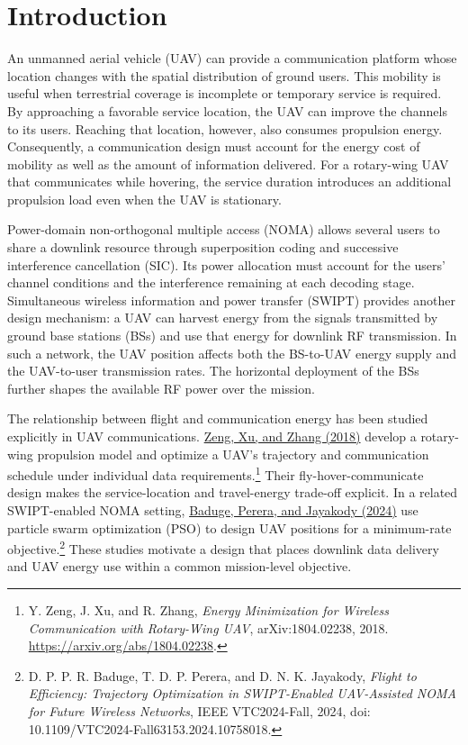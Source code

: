 \documentclass[conference]{IEEEtran}
\begin{document}
\section{Introduction}
\label{sec:introduction}
An unmanned aerial vehicle (UAV) can provide a communication platform whose location changes with the spatial distribution of ground users. This mobility is useful when terrestrial coverage is incomplete or temporary service is required. By approaching a favorable service location, the UAV can improve the channels to its users. Reaching that location, however, also consumes propulsion energy. Consequently, a communication design must account for the energy cost of mobility as well as the amount of information delivered. For a rotary-wing UAV that communicates while hovering, the service duration introduces an additional propulsion load even when the UAV is stationary.

Power-domain non-orthogonal multiple access (NOMA) allows several users to share a downlink resource through superposition coding and successive interference cancellation (SIC). Its power allocation must account for the users' channel conditions and the interference remaining at each decoding stage. Simultaneous wireless information and power transfer (SWIPT) provides another design mechanism: a UAV can harvest energy from the signals transmitted by ground base stations (BSs) and use that energy for downlink RF transmission. In such a network, the UAV position affects both the BS-to-UAV energy supply and the UAV-to-user transmission rates. The horizontal deployment of the BSs further shapes the available RF power over the mission.

The relationship between flight and communication energy has been studied explicitly in UAV communications. \href{https://arxiv.org/abs/1804.02238}{Zeng, Xu, and Zhang (2018)} develop a rotary-wing propulsion model and optimize a UAV's trajectory and communication schedule under individual data requirements.\footnote{Y. Zeng, J. Xu, and R. Zhang, \emph{Energy Minimization for Wireless Communication with Rotary-Wing UAV}, arXiv:1804.02238, 2018. \url{https://arxiv.org/abs/1804.02238}.} Their fly-hover-communicate design makes the service-location and travel-energy trade-off explicit. In a related SWIPT-enabled NOMA setting, \href{https://doi.org/10.1109/VTC2024-Fall63153.2024.10758018}{Baduge, Perera, and Jayakody (2024)} use particle swarm optimization (PSO) to design UAV positions for a minimum-rate objective.\footnote{D. P. P. R. Baduge, T. D. P. Perera, and D. N. K. Jayakody, \emph{Flight to Efficiency: Trajectory Optimization in SWIPT-Enabled UAV-Assisted NOMA for Future Wireless Networks}, IEEE VTC2024-Fall, 2024, doi: 10.1109/VTC2024-Fall63153.2024.10758018.} These studies motivate a design that places downlink data delivery and UAV energy use within a common mission-level objective.
\end{document}
